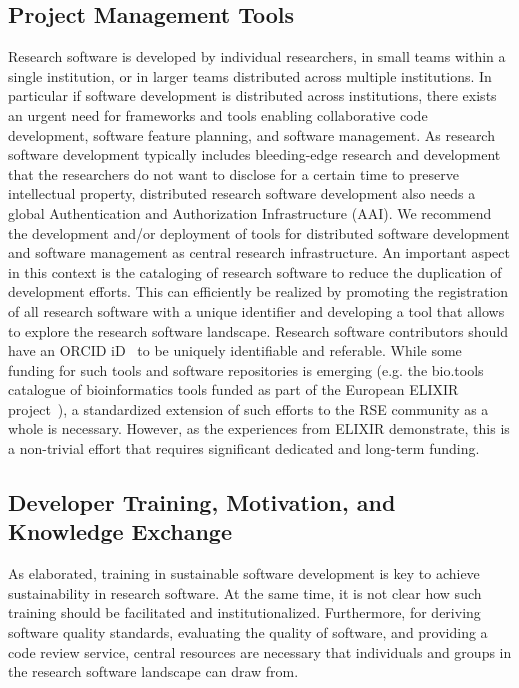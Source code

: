 \documentclass[a4paper,num-refs,numbers,sort&compress]{de-rse}
\begin{document}
\subsection{Project Management Tools}
\label{sec:infrastructure:PM}
Research software is developed by individual researchers, in small teams within a single institution, or in larger teams distributed across multiple institutions. In particular if software development is distributed across institutions, there exists an urgent need for frameworks and tools enabling collaborative code development, software feature planning, and software management. As research software development typically includes bleeding-edge research and development that the researchers do not want to disclose for a certain time to preserve intellectual property, distributed research software development also needs a global Authentication and Authorization Infrastructure (AAI). We recommend the development and/or deployment of tools for distributed software development and software management as central research infrastructure. An important aspect in this context is the cataloging of research software to reduce the duplication of development efforts. This can efficiently be realized by promoting the registration of all research software with a unique identifier and developing a tool that allows to explore the research software landscape. Research software contributors should have an ORCID iD~\cite{ORCiD} to be uniquely identifiable and referable. While some funding for such tools and software repositories is emerging (e.g. the bio.tools catalogue of bioinformatics tools funded as part of the European ELIXIR project~\cite{bio.tools}), a standardized extension of such efforts to the RSE community as a whole is necessary. However, as the experiences from ELIXIR
demonstrate, this is a non-trivial effort that requires significant dedicated
and long-term funding.

\subsection{Developer Training, Motivation, and Knowledge Exchange}
As elaborated, training in sustainable software development is key to achieve sustainability in research software. At the same time, it is not clear how such training should be facilitated and institutionalized. Furthermore, for deriving software quality standards, evaluating the quality of software, and providing a code review service, central resources are necessary that individuals and groups in the research software landscape can draw from.
\end{document}
